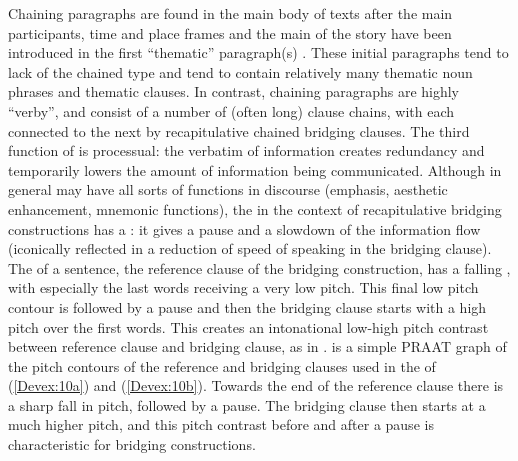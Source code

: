 \documentclass[output=paper]{LSP/langsci}
\begin{document}
Chaining paragraphs are found in the main body of  texts after  the main participants, time and place frames and the main  of the story have been introduced in the first ``thematic'' paragraph(s) \citep[][369]{devries.2005}. These initial paragraphs tend to lack  of the chained type and tend to contain relatively many thematic noun phrases and thematic clauses. In contrast, chaining paragraphs are highly ``verby'', and consist of a number of (often long) clause chains, with each  connected to the next by recapitulative chained bridging clauses. The third function of  is processual: the verbatim   of information creates redundancy and temporarily lowers the amount of information being communicated. Although  in general may have all sorts of functions in discourse (emphasis, aesthetic enhancement, mnemonic functions), the  in the context of recapitulative bridging constructions has a : it gives a pause and a slowdown of the information flow (iconically reflected in a reduction of speed of speaking in the bridging clause). The  of a sentence, the reference clause of the bridging construction, has a falling , with especially the last words receiving a very low pitch. This final low pitch contour is followed by a pause and then the bridging clause starts with a high pitch over the first words. This creates an intonational low-high pitch contrast between reference clause and bridging clause, as in .  is a simple PRAAT graph of the pitch contours of the reference and bridging clauses used in the  of (\ref{Devex:10a}) and (\ref{Devex:10b}). Towards the end of the reference clause there is a sharp fall in pitch, followed by a pause. The bridging clause then starts at a much higher pitch, and this pitch contrast before and after a pause is characteristic for bridging constructions.\nocite{PRAAT}
\end{document}
